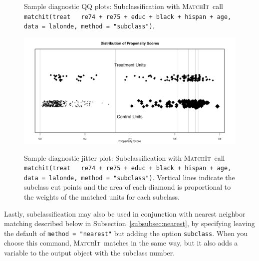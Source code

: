 \documentclass[oneside,letterpaper,titlepage]{article}
\newcommand{\MatchIt}{\textsc{MatchIt}}
\begin{document}
\begin{figure}[tbp]
\begin{center}
    \hfill
    \caption{Sample diagnostic QQ plots: Subclassification with
      \MatchIt\ call \texttt{matchit(treat ~ re74 + re75 + educ +
        black + hispan + age, data = lalonde, method = "subclass")}.}
\label{diagqqsub}
\end{center}
\end{figure}

\begin{figure}[tbp]
  \begin{center}
    {\includegraphics[scale=0.7]{figs/jitterplotsub}}
    \hfill
    \caption{Sample diagnostic jitter plot: Subclassification with
      \MatchIt\ call \texttt{matchit(treat ~ re74 + re75 + educ +
        black + hispan + age, data = lalonde, method = "subclass")}.
      Vertical lines indicate the subclass cut points and the area of
      each diamond is proportional to the weights of the matched units
      for each subclass.}
\label{diagjittersub}
\end{center}
\end{figure}


Lastly, subclassification may also be used in conjunction with nearest
neighbor matching described below in
Subsection~\ref{subsubsec:nearest}, by specifying leaving the default
of \texttt{method = "nearest"} but adding the option
\texttt{subclass}.  When you choose this command, \MatchIt\ matches in
the same way, but it also adds a variable to the output object with
the subclass number.



\end{document}
